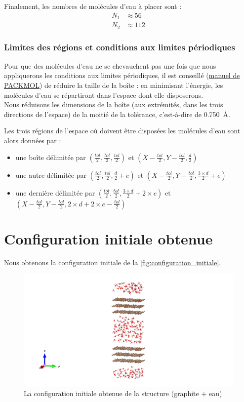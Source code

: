 \documentclass[11pt, a4paper]{article}
\begin{document}
Finalement, les nombres de molécules d'eau à placer sont :
\begin{equation*}
	\boxed%
	{
	\begin{aligned}
		N_1 &\approx \num{56}\\
		N_2 &\approx \num{112}
	\end{aligned}
	}
\end{equation*}

		\subsubsection{Limites des régions et conditions aux limites périodiques}

Pour que des molécules d'eau ne se chevauchent pas une fois que nous appliquerons les conditions aux limites périodiques, il est conseillé (\href{https://m3g.github.io/packmol/userguide.shtml#pbc}{manuel de PACKMOL}) de réduire la taille de la boîte : en minimisant l'énergie, les molécules d'eau se répartiront dans l'espace dont elle disposerons.\\
Nous réduisons les dimensions de la boîte (aux extrémités, dans les trois directions de l'espace) de la moitié de la tolérance, c'est-à-dire de \qty{0.750}{\angstrom}.

Les trois régions de l'espace où doivent être disposées les molécules d'eau sont alors données par :
\begin{itemize}
	\item une boîte délimitée par $(\frac{tol}{2}, \frac{tol}{2}, \frac{tol}{2})$ et $(X - \frac{tol}{2}, Y - \frac{tol}{2}, \frac{d}{2})$
	\item une autre délimitée par $(\frac{tol}{2}, \frac{tol}{2}, \frac{d}{2} + e)$ et $(X - \frac{tol}{2}, Y - \frac{tol}{2}, \frac{3 \times d}{2} + e)$
	\item une dernière délimitée par $(\frac{tol}{2}, \frac{tol}{2}, \frac{3 \times d}{2} + 2 \times e)$ et $(X - \frac{tol}{2}, Y - \frac{tol}{2}, 2 \times d + 2 \times e - \frac{tol}{2})$
\end{itemize}

\section{Configuration initiale obtenue}

Nous obtenons la configuration initiale de la \autoref{fig:configuration_initiale}.

\begin{figure}[hptb]
	\centering
	\includegraphics[width=\linewidth]{configuration_initiale.png}
	\caption{La configuration initiale obtenue de la structure (graphite + eau)}
	\label{fig:configuration_initiale}
\end{figure}
\end{document}
